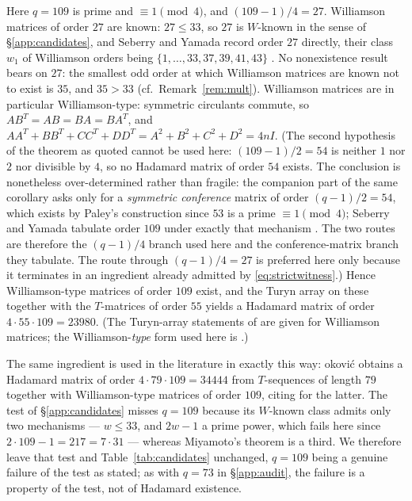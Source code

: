 \documentclass[11pt]{article}
\begin{document}
Here \(q=109\) is prime and \(\equiv1\pmod 4\), and \((109-1)/4=27\).
Williamson matrices of order \(27\) are known: \(27\le33\), so \(27\) is
\(W\)-known in the sense of \S\ref{app:candidates}, and Seberry and
Yamada record order \(27\) directly, their class \(w_{1}\) of Williamson
orders being \(\{1,\dots,33,37,39,41,43\}\)
\cite[Table~A.1 and legend, pp.~541--543]{SeberryYamada1992}.  No
nonexistence result bears on \(27\): the smallest odd order at which
Williamson matrices are known not to exist is \(35\), and \(35>33\)
(cf.\ Remark~\ref{rem:mult}).  Williamson
matrices are in particular Williamson-type: symmetric circulants
commute, so \(AB^{T}=AB=BA=BA^{T}\), and
\(AA^{T}+BB^{T}+CC^{T}+DD^{T}=A^{2}+B^{2}+C^{2}+D^{2}=4nI\).  (The
second hypothesis of the theorem as quoted cannot be used here:
\((109-1)/2=54\) is neither \(1\) nor \(2\) nor divisible by \(4\), so
no Hadamard matrix of order \(54\) exists.  The conclusion is
nonetheless over-determined rather than fragile: the companion part of
the same corollary \cite[Cor.~8.8(2), p.~505]{SeberryYamada1992} asks
only for a \emph{symmetric conference} matrix of order
\((q-1)/2=54\), which exists by Paley's construction since \(53\) is a
prime \(\equiv1\pmod4\); Seberry and Yamada tabulate order \(109\) under
exactly that mechanism \cite[Table~A.1, p.~543]{SeberryYamada1992}.  The
two routes are therefore the \((q-1)/4\) branch used here and the
conference-matrix branch they tabulate.  The route through
\((q-1)/4=27\) is preferred here only because it terminates in an
ingredient already admitted by \eqref{eq:strictwitness}.)  Hence
Williamson-type matrices of order
\(109\) exist, and the Turyn array on these together with the
\(T\)-matrices of order \(55\)
\cite{Turyn1974,SeberryYamada1992,SeberryYamada2020,CatiPasechnik2024}
yields a Hadamard matrix of order \(4\cdot55\cdot109=23980\).  (The
Turyn-array statements of \cite{SeberryYamada1992} are given for
Williamson matrices; the Williamson-\emph{type} form used here is
\cite[Thm.~5]{CatiPasechnik2024}.)

The same ingredient is used in the literature in exactly this way:
\DJ okovi\'c \cite[Prop.~3.4]{Djokovic2011} obtains a Hadamard matrix
of order \(4\cdot79\cdot109=34444\) from \(T\)-sequences of length
\(79\) together with Williamson-type matrices of order \(109\), citing
\cite{SeberryYamada1992} for the latter.  The test of
\S\ref{app:candidates} misses \(q=109\) because its \(W\)-known class
admits only two mechanisms --- \(w\le33\), and \(2w-1\) a prime power,
which fails here since \(2\cdot109-1=217=7\cdot31\) --- whereas
Miyamoto's theorem is a third.  We therefore leave that test and
Table~\ref{tab:candidates} unchanged, \(q=109\) being a genuine failure
of the test as stated; as with \(q=73\) in \S\ref{app:audit}, the
failure is a property of the test, not of Hadamard existence.
\end{document}

